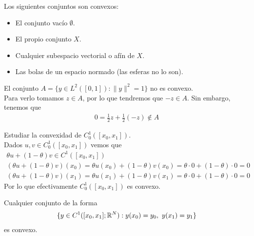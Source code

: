 \begin{observacion}
    Los siguientes conjuntos son convexos:
    \begin{itemize}
        \item El conjunto vacío $\emptyset$.
        \item El propio conjunto $X$.
        \item Cualquier subespacio vectorial o afín de $X$.
        \item Las bolas de un espacio normado (las esferas no lo son).
    \end{itemize}
\end{observacion}

\begin{ejemplo}
    El conjunto $A=\{y\in L^2([0,1]): \|y\|^2=1\}$ no es convexo.\\
    
    Para verlo tomamos $z\in A$, por lo que tendremos que $-z\in A$. Sin embargo, tenemos que 
    \begin{gather*}
        0 = \frac{1}{2}z + \frac{1}{2}(-z) \notin A
    \end{gather*}
\end{ejemplo}

\begin{ejemplo}
    Estudiar la convexidad de $C_0^1([x_0, x_1])$.\\

    Dados $u,v\in C_0^1([x_0, x_1])$ vemos que 
    \begin{gather*}
        \theta u + (1-\theta)v \in C^1([x_0, x_1])\\
        (\theta u + (1-\theta)v)(x_0) = \theta u(x_0) + (1-\theta)v(x_0) = \theta \cdot 0 + (1-\theta) \cdot 0 = 0\\
        (\theta u + (1-\theta)v)(x_1) = \theta u(x_1) + (1-\theta)v(x_1) = \theta \cdot 0 + (1-\theta) \cdot 0 = 0
    \end{gather*}
    Por lo que efectivamente $C_0^1([x_0, x_1])$ es convexo.
\end{ejemplo}

\begin{observacion}
    Cualquier conjunto de la forma
    \begin{gather*}
        \{y\in C^1([x_0, x_1];\mathbb{R}^N) : y(x_0) = y_0,\ y(x_1) = y_1\}
    \end{gather*}
    es convexo.
\end{observacion}

